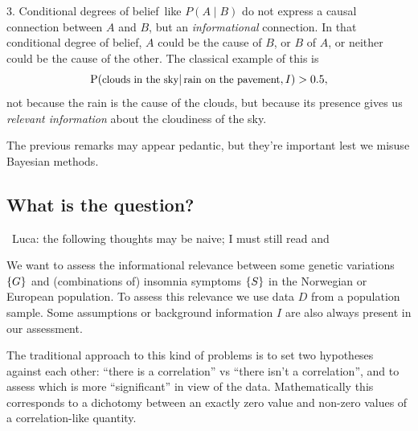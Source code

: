 \documentclass[\ifafour a4paper,12pt,\else a5paper,10pt,\fi%
onecolumn,oneside,article,%
british%
]{memoir}
\theoremstyle{remark}
\theoremstyle{innote}
\newcommand*{\citep}{\parencites}
\DeclarePairedDelimiter\set{\{}{\}}
\newcommand*{\p}{\mathrm{P}}%
\renewcommand*{\|}{\mathpunct{|}}
\newcommand*{\puzzle}{\maltese}
\newcommand{\mynote}[1]{ {\color{notecolour}\puzzle\ #1}}
\newcommand*{\dob}{degree of belief}
\newcommand*{\dobs}{degrees of belief}
\newcommand*{\yD}{D}
\newcommand*{\yG}{G}
\newcommand*{\yS}{S}
\newcommand*{\yI}{I}
\begin{document}
\medskip

3. Conditional \dobs\ like $P(A \| B)$ do not express a causal connection
between $A$ and $B$, but an \emph{informational} connection. In that
conditional \dob, $A$ could be the cause of $B$, or $B$ of $A$, or neither
could be the cause of the other. The classical example of this is
\begin{equation}
  \label{eq:pre_rain_clouds}
  \p(\text{\small clouds in the sky} \| \text{\small rain on the pavement}, I) > 0.5,
\end{equation}
not because the rain is the cause of the clouds, but because its presence gives us
\emph{relevant information} about the cloudiness of the sky.

\medskip

The previous remarks may appear pedantic, but they're important lest we
misuse Bayesian methods.

\subsection{What is the question?}
\label{sec:pre_what_question}

\mynote{Luca: the following thoughts may be naive; I must still read
  \citep{stingoetal2015} and \citep{bushetal2012}}

We want to assess the informational relevance between some genetic
variations $\set{\yG}$ and (combinations of) insomnia symptoms $\set{\yS}$
in the Norwegian or European population. To assess this relevance we use
data $\yD$ from a population sample. Some assumptions or background
information $\yI$ are also always present in our assessment.

The traditional approach to this kind of problems is to set two hypotheses
against each other: \enquote{there is a correlation} vs \enquote{there
  isn't a correlation}, and to assess which is more \enquote{significant}
in view of the data. Mathematically this corresponds to a dichotomy between
an exactly zero value and non-zero values of a correlation-like quantity.
\end{document}
